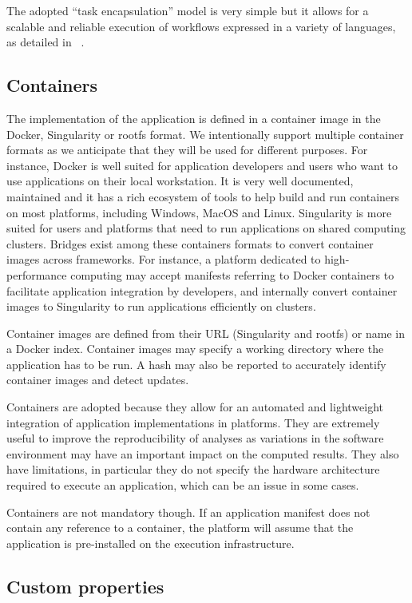 \documentclass{article}
\begin{document}
The adopted ``task encapsulation'' model is very simple but it
allows for a scalable and reliable execution of workflows expressed in
a variety of languages, as detailed in ~\cite{glatard2016fgcs}.

\subsection{Containers}

The implementation of the application is defined in a container image
in the Docker, Singularity or rootfs format. We intentionally support
multiple container formats as we anticipate that they will be used for
different purposes. For instance, Docker is well suited for
application developers and users who want to use applications on their
local workstation. It is very well documented, maintained and it has a
rich ecosystem of tools to help build and run containers on most
platforms, including Windows, MacOS and Linux. Singularity is more
suited for users and platforms that need to run applications on shared
computing clusters. Bridges exist among these containers formats to
convert container images across frameworks. For instance, a platform
dedicated to high-performance computing may accept manifests referring
to Docker containers to facilitate application integration by
developers, and internally convert container images to Singularity to
run applications efficiently on clusters.

Container images are defined from their URL (Singularity and rootfs)
or name in a Docker index. Container images may specify a working
directory where the application has to be run. A hash may also be
reported to accurately identify container images and detect updates.

Containers are adopted because they allow for an automated and
lightweight integration of application implementations in
platforms. They are extremely useful to improve the reproducibility of
analyses as variations in the software environment may have an
important impact on the computed results. They also have limitations,
in particular they do not specify the hardware architecture required
to execute an application, which can be an issue in some cases.

Containers are not mandatory though. If an application manifest does
not contain any reference to a container, the platform will assume
that the application is pre-installed on the execution infrastructure. 

\subsection{Custom properties}
\end{document}
